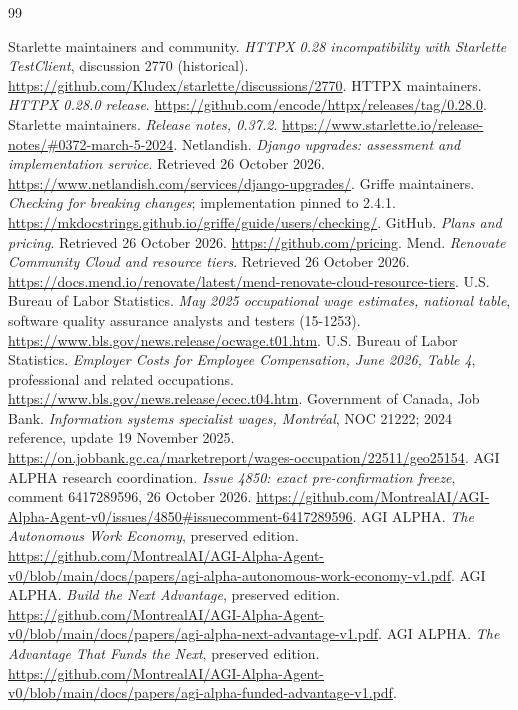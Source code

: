\documentclass[11pt,letterpaper]{article}
\begin{document}
\begin{thebibliography}{99}\small\raggedright
{} Starlette maintainers and community. \emph{HTTPX 0.28 incompatibility with Starlette TestClient}, discussion 2770 (historical). \url{https://github.com/Kludex/starlette/discussions/2770}.
 HTTPX maintainers. \emph{HTTPX 0.28.0 release}. \url{https://github.com/encode/httpx/releases/tag/0.28.0}.
 Starlette maintainers. \emph{Release notes, 0.37.2}. \url{https://www.starlette.io/release-notes/#0372-march-5-2024}.
 Netlandish. \emph{Django upgrades: assessment and implementation service}. Retrieved 26 October 2026. \url{https://www.netlandish.com/services/django-upgrades/}.
 Griffe maintainers. \emph{Checking for breaking changes}; implementation pinned to 2.4.1. \url{https://mkdocstrings.github.io/griffe/guide/users/checking/}.
 GitHub. \emph{Plans and pricing}. Retrieved 26 October 2026. \url{https://github.com/pricing}.
 Mend. \emph{Renovate Community Cloud and resource tiers}. Retrieved 26 October 2026. \url{https://docs.mend.io/renovate/latest/mend-renovate-cloud-resource-tiers}.
 U.S. Bureau of Labor Statistics. \emph{May 2025 occupational wage estimates, national table}, software quality assurance analysts and testers (15-1253). \url{https://www.bls.gov/news.release/ocwage.t01.htm}.
 U.S. Bureau of Labor Statistics. \emph{Employer Costs for Employee Compensation, June 2026, Table 4}, professional and related occupations. \url{https://www.bls.gov/news.release/ecec.t04.htm}.
 Government of Canada, Job Bank. \emph{Information systems specialist wages, Montréal}, NOC 21222; 2024 reference, update 19 November 2025. \url{https://on.jobbank.gc.ca/marketreport/wages-occupation/22511/geo25154}.
 AGI ALPHA research coordination. \emph{Issue 4850: exact pre-confirmation freeze}, comment 6417289596, 26 October 2026. \url{https://github.com/MontrealAI/AGI-Alpha-Agent-v0/issues/4850#issuecomment-6417289596}.
 AGI ALPHA. \emph{The Autonomous Work Economy}, preserved edition. \url{https://github.com/MontrealAI/AGI-Alpha-Agent-v0/blob/main/docs/papers/agi-alpha-autonomous-work-economy-v1.pdf}.
 AGI ALPHA. \emph{Build the Next Advantage}, preserved edition. \url{https://github.com/MontrealAI/AGI-Alpha-Agent-v0/blob/main/docs/papers/agi-alpha-next-advantage-v1.pdf}.
 AGI ALPHA. \emph{The Advantage That Funds the Next}, preserved edition. \url{https://github.com/MontrealAI/AGI-Alpha-Agent-v0/blob/main/docs/papers/agi-alpha-funded-advantage-v1.pdf}.

\end{thebibliography}
\end{document}
